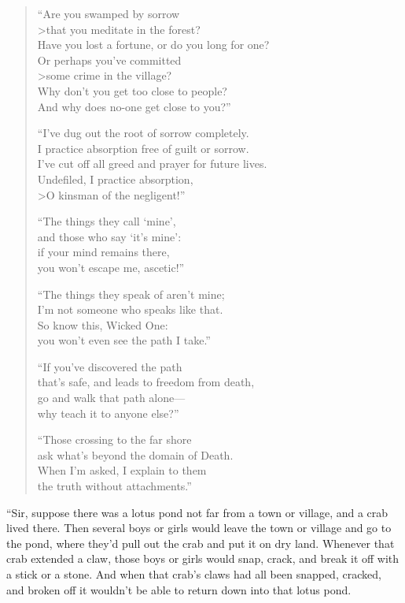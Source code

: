\documentclass[12pt,openany]{book}%
\begin{document}
\begin{verse}%
“Are you swamped by sorrow \\>that you meditate in the forest? \\
Have you lost a fortune, or do you long for one? \\
Or perhaps you’ve committed \\>some crime in the village? \\
Why don’t you get too close to people? \\
And why does no-one get close to you?” 

“I’ve dug out the root of sorrow completely. \\
I practice absorption free of guilt or sorrow. \\
I’ve cut off all greed and prayer for future lives. \\
Undefiled, I practice absorption, \\>O kinsman of the negligent!” 

“The things they call ‘mine’, \\
and those who say ‘it’s mine’: \\
if your mind remains there, \\
you won’t escape me, ascetic!” 

“The things they speak of aren’t mine; \\
I’m not someone who speaks like that. \\
So know this, Wicked One: \\
you won’t even see the path I take.” 

“If you’ve discovered the path \\
that’s safe, and leads to freedom from death, \\
go and walk that path alone—\\
why teach it to anyone else?” 

“Those crossing to the far shore \\
ask what’s beyond the domain of Death. \\
When I’m asked, I explain to them \\
the truth without attachments.” 

%
\end{verse}

“Sir, suppose there was a lotus pond not far from a town or village, and a crab lived there. Then several boys or girls would leave the town or village and go to the pond, where they’d pull out the crab and put it on dry land. Whenever that crab extended a claw, those boys or girls would snap, crack, and break it off with a stick or a stone. And when that crab’s claws had all been snapped, cracked, and broken off it wouldn’t be able to return down into that lotus pond. 
\end{document}

